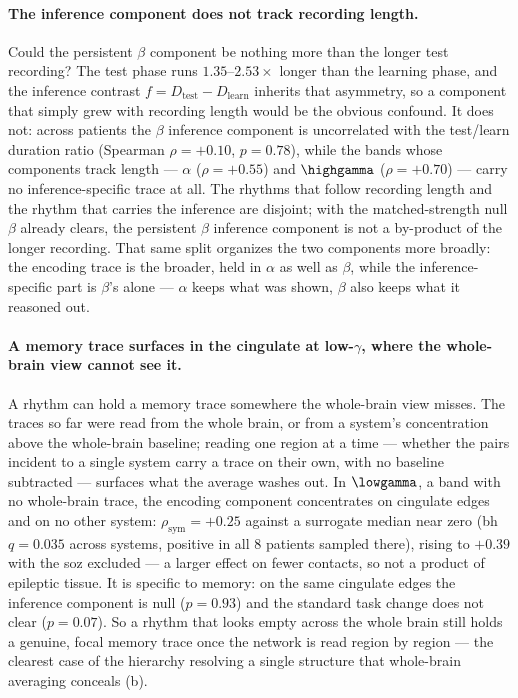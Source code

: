 \paragraph{The inference component does not track recording length.}
Could the persistent \(\beta\) component be nothing more than the longer test recording? The test phase runs \(1.35\)--\(2.53\times\) longer than the learning phase, and the inference contrast \(f = D_{\mathrm{test}} - D_{\mathrm{learn}}\) inherits that asymmetry, so a component that simply grew with recording length would be the obvious confound. It does not: across patients the \(\beta\) inference component is uncorrelated with the test/learn duration ratio (Spearman \(\rho = {+}0.10\), \(p = 0.78\)), while the bands whose components track length --- \(\alpha\) (\(\rho = {+}0.55\)) and \(\highgamma\) (\(\rho = {+}0.70\)) --- carry no inference-specific trace at all. The rhythms that follow recording length and the rhythm that carries the inference are disjoint; with the matched-strength null \(\beta\) already clears, the persistent \(\beta\) inference component is not a by-product of the longer recording. That same split organizes the two components more broadly: the encoding trace is the broader, held in \(\alpha\) as well as \(\beta\), while the inference-specific part is \(\beta\)'s alone --- \(\alpha\) keeps what was shown, \(\beta\) also keeps what it reasoned out.

\paragraph{A memory trace surfaces in the cingulate at low-\(\gamma\), where the whole-brain view cannot see it.}
A rhythm can hold a memory trace somewhere the whole-brain view misses. The traces so far were read from the whole brain, or from a system's concentration above the whole-brain baseline; reading one region at a time --- whether the pairs incident to a single system carry a trace on their own, with no baseline subtracted --- surfaces what the average washes out. In \(\lowgamma\), a band with no whole-brain trace, the encoding component concentrates on cingulate edges and on no other system: \(\rho_{\mathrm{sym}} = {+}0.25\) against a surrogate median near zero (\gls{bh} \(q = 0.035\) across systems, positive in all \(8\) patients sampled there), rising to \({+}0.39\) with the \gls{soz} excluded --- a larger effect on fewer contacts, so not a product of epileptic tissue. It is specific to memory: on the same cingulate edges the inference component is null (\(p = 0.93\)) and the standard task change does not clear (\(p = 0.07\)). So a rhythm that looks empty across the whole brain still holds a genuine, focal memory trace once the network is read region by region --- the clearest case of the hierarchy resolving a single structure that whole-brain averaging conceals (b).

